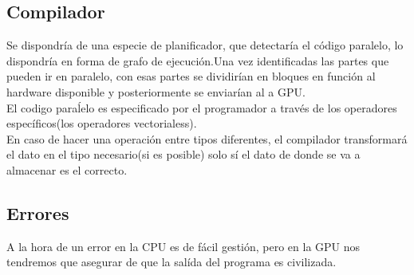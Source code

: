\documentclass[12pt,a4paper]{article}
\begin{document}
\subsection{Compilador}
Se dispondría de una especie de planificador, que detectaría el código paralelo,
lo dispondría en forma de grafo de ejecución.Una vez identificadas las partes
que pueden ir en paralelo, con esas partes se dividirían en bloques en función
al hardware disponible y posteriormente se enviarían al a GPU.\\
El codigo paraĺelo es especificado por el programador a través de los operadores
específicos(los operadores vectorialess).\\
En caso de hacer una operación entre tipos diferentes, el compilador
transformará el dato en el tipo necesario(si es posible) solo sí el dato de
donde se va a almacenar es el correcto.
\subsection{Errores}
A la hora de un error en la CPU es de fácil gestión, pero en la GPU nos
tendremos que asegurar de que la salída del programa es civilizada.
\end{document}
